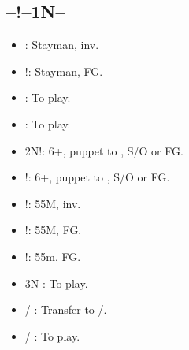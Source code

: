 \documentclass[12pt,twoside,a5paper]{report}%
\begin{document}
	\subsection*{--!--1N--}
	\begin{itemize}
	\renewcommand{\labelitemi}{}
	\item {} : Stayman, inv.
	\item {}!: Stayman, FG.
	\item {} : To play.
	\item {} : To play.
	\item 2N!: 6+\cl{}, puppet to , S/O or FG.
	\item {}!: 6+\di{}, puppet to , S/O or FG.
	\item {}!: 55M, inv.
	\item {}!: 55M, FG.
	\item {}!: 55m, FG.
	\item 3N : To play.
	\item {}/ : Transfer to /\sp{}.
	\item {}/ : To play.
	\end{itemize}


\end{document}

